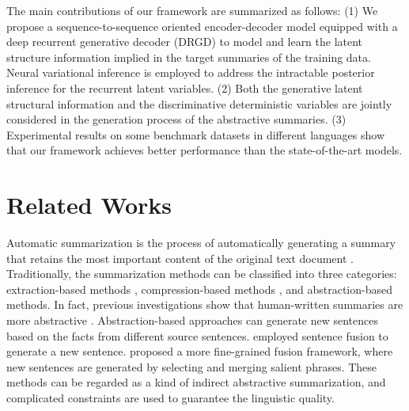 \documentclass[11pt,letterpaper]{article}
\begin{document}
The main contributions of our framework are summarized as follows:
(1) We propose a sequence-to-sequence oriented encoder-decoder model equipped with a deep recurrent generative decoder (DRGD) to model and learn the latent structure information implied in the target summaries of the training data. Neural variational inference is employed to address the intractable posterior inference for the recurrent latent variables.
(2) Both the generative latent structural information and the discriminative deterministic variables are jointly considered in the generation process of the abstractive summaries.
(3) Experimental results on some benchmark datasets in different languages show that our framework achieves better performance than the state-of-the-art models.


\section{Related Works}
Automatic summarization is the process of automatically generating a summary that retains the most important content of the original text document \cite{nenkova2012survey}.
Traditionally, the summarization methods can be classified into three categories:  extraction-based methods \cite{erkan2004lexrank,goldstein2000multi,wan2007manifold,min2012exploiting,nallapati2016summarunner,cheng2016neural,cao2016attsum,song2017summarizing}, compression-based methods \cite{li2013document,wang2013sentence,li2015reader,li2017salience}, and abstraction-based methods.
In fact, previous investigations show that human-written summaries are more abstractive \cite{barzilay2005sentence,lidong15absmds}.
Abstraction-based approaches can generate new sentences based on the facts from different source sentences.
\citet{barzilay2005sentence} employed sentence fusion to generate
a new sentence. \citet{lidong15absmds} proposed a more fine-grained fusion framework, where new sentences are generated by selecting and merging salient phrases.
These methods can be regarded as a kind of indirect abstractive summarization, and complicated constraints are used to guarantee the linguistic quality.
\end{document}
